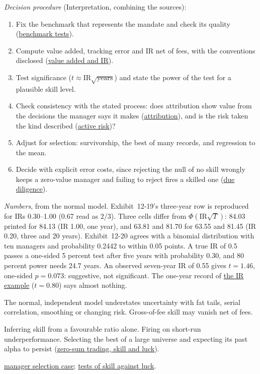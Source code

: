\begin{qfmethod}
 \emph{Decision procedure} (Interpretation, combining the sources):
\begin{enumerate}
\item Fix the benchmark that represents the mandate and check its quality (\hyperref[meth:benchmark-selection-quality]{benchmark tests}).
\item Compute value added, tracking error and IR net of fees, with the conventions disclosed (\hyperref[meth:active-return-information-ratio]{value added and IR}).
\item Test significance ($t\approx\text{IR}\sqrt{\text{years}}$) and state the power of the test for a plausible skill level.
\item Check consistency with the stated process: does attribution show value from the decisions the manager says it makes (\hyperref[meth:return-attribution]{attribution}), and is the risk taken the kind described (\hyperref[meth:active-risk-decomposition]{active risk})?
\item Adjust for selection: survivorship, the best of many records, and regression to the mean.
\item Decide with explicit error costs, since rejecting the null of no skill wrongly keeps a zero-value manager and failing to reject fires a skilled one (\hyperref[meth:manager-due-diligence]{due diligence}).
\end{enumerate}
\emph{Numbers}, from the normal model. Exhibit~12-19's three-year row is reproduced for IRs 0.30--1.00 (0.67 read as 2/3). Three cells differ from $\Phi(\text{IR}\sqrt T)$: 84.03 printed for 84.13 (IR 1.00, one year), and 63.81 and 81.70 for 63.55 and 81.45 (IR 0.20, three and 20 years). Exhibit~12-20 agrees with a binomial distribution with ten managers and probability 0.2442 to within 0.05 points. A true IR of 0.5 passes a one-sided 5 percent test after five years with probability 0.30, and 80 percent power needs 24.7 years. An observed seven-year IR of 0.55 gives $t=1.46$, one-sided $p=0.073$: suggestive, not significant. The one-year record of \hyperref[meth:active-return-information-ratio]{the IR example} ($t=0.80$) says almost nothing.

 The normal, independent model understates uncertainty with fat tails, serial correlation, smoothing or changing risk. Gross-of-fee skill may vanish net of fees.

 Inferring skill from a favourable ratio alone. Firing on short-run underperformance. Selecting the best of a large universe and expecting its past alpha to persist (\hyperref[res:zero-sum-skill-luck]{zero-sum trading, skill and luck}).

 \hyperref[ex:manager-selection-case]{manager selection case}; \hyperref[meth:skill-luck-significance-tests]{tests of skill against luck}.

\end{qfmethod}
